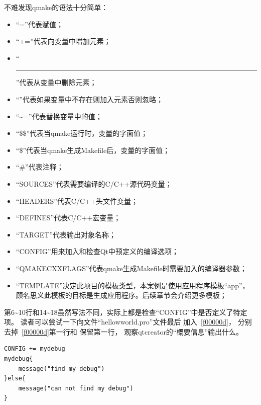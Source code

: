 不难发现qmake的语法十分简单：
\begin{itemize}
\item “{\sourcefonttwo{}=}”代表赋值；
\item “{\sourcefonttwo{}+}{\sourcefonttwo{}=}”代表向变量中增加元素；
\item “\hspace{0.05em}\rule[0.7ex]{0.4em}{0.6pt}\hspace{0.05em}{\sourcefonttwo{}=}”代表从变量中删除元素；
\item “\raisebox{-0.3ex}{\sourcefonttwo{}*}{\sourcefonttwo{}=}”代表如果变量中不存在则加入元素否则忽略；
\item “{\sourcefonttwo\~{}}{\sourcefonttwo{}=}”代表替换变量中的值；
\item “{\sourcefonttwo\$}{\sourcefonttwo\$}”代表当qmake运行时，变量的字面值；
\item “{\sourcefonttwo\$}”代表当qmake生成Makefile后，变量的字面值；
\item “{\sourcefonttwo\#}”代表注释；
\item “SOURCES”代表需要编译的C/C{\sourcefonttwo{}+}{\sourcefonttwo{}+}源代码变量；
\item “HEADERS”代表C/C{\sourcefonttwo{}+}{\sourcefonttwo{}+}头文件变量；
\item “DEFINES”代表C/C{\sourcefonttwo{}+}{\sourcefonttwo{}+}宏变量；
\item “TARGET”代表输出对象名称；
\item “CONFIG”用来加入和检查Qt中预定义的编译选项；
\item “QMAKE\underline{\hspace{0.5em}}CXXFLAGS”代表qmake生成Makefile时需要加入的编译器参数；
\item “TEMPLATE”决定此项目的模板类型，本案例是使用应用程序模板“app”，
顾名思义此模板的目标是生成应用程序。后续章节会介绍更多模板；
\end{itemize}

第6{\sourcefonttwo\~{}}10行和14{\sourcefonttwo\~{}}18虽然写法不同，实际上都是检查“CONFIG”中是否定义了特定项。
读者可以尝试一下向文件“hellow\underline{\hspace{0.5em}}world.pro”文件最后
加入\lstlistingname\ \ref{f00000d}，
分别去掉\lstlistingname\ \ref{f00000d}第一行和
保留第一行，
观察qtcreator的“概要信息”输出什么。
\begin{lstlisting}[label=f00000d,
caption=GoodLuck,
title=\lstlistingname\ \thelstlisting
]
CONFIG += mydebug
mydebug{
    message("find my debug")
}else{
    message("can not find my debug")
}
\end{lstlisting}          %




